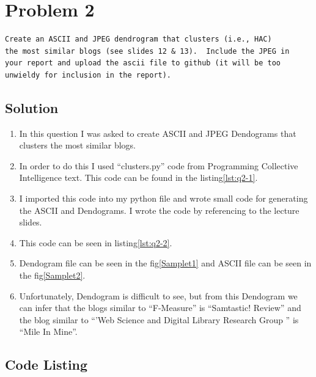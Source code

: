 

\section{Problem 2}
\label{part2}
\begin{verbatim}
Create an ASCII and JPEG dendrogram that clusters (i.e., HAC)
the most similar blogs (see slides 12 & 13).  Include the JPEG in
your report and upload the ascii file to github (it will be too
unwieldy for inclusion in the report).

\end{verbatim}

\subsection{Solution}
\begin{enumerate}
\item In this question I was asked to create ASCII and JPEG Dendograms that clusters the most similar blogs. 
\item In order to do this I used ``clusters.py'' code from Programming Collective Intelligence text. This code can be found in the listing\ref{lst:q2-1}.
\item I imported this code into my python file and wrote small code for generating the ASCII and Dendograms. I wrote the code by referencing to the lecture slides.
\item This code can be seen in listing\ref{lst:q2-2}.
\item Dendogram file can be seen in the fig\ref{Samplet1} and ASCII file can be seen in the fig\ref{Samplet2}.
\item Unfortunately, Dendogram is difficult to see, but from this Dendogram we can infer that the blogs similar to ``F-Measure'' is ``Samtastic! Review'' and the blog similar to ``'Web Science and Digital Library Research Group '' is ``Mile In Mine''.
\end{enumerate}
\newpage

\subsection{Code Listing}


\newpage

